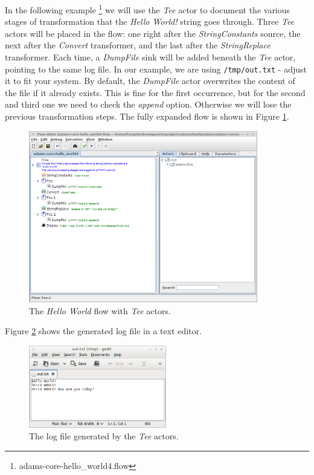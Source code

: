 In the following example \footnote{adams-core-hello\_world4.flow} we will use
the \textit{Tee} actor to document the various stages of transformation that the \textit{Hello World!} string goes
through. Three \textit{Tee} actors will be placed in the flow: one right after
the \textit{StringConstants} source, the next after the \textit{Convert}
transformer, and the last after the \textit{StringReplace} transformer.
Each time, a \textit{DumpFile} sink will be added beneath the \textit{Tee}
actor, pointing to the same log file. In our example, we are using
\texttt{/tmp/out.txt} - adjust it to fit your system. By default, the
\textit{DumpFile} actor overwrites the content of the file if it already exists.
This is fine for the first occurrence, but for the second and third one we need
to check the \textit{append} option. Otherwise we will lose the previous
transformation steps. The fully expanded flow is shown in Figure
\ref{floweditor-helloworld-tee_flow}.
\begin{figure}[htb]
  \centering
  \includegraphics[width=10.0cm]{images/floweditor-helloworld-tee_flow.png}
  \caption{The \textit{Hello World} flow with \textit{Tee} actors.}
  \label{floweditor-helloworld-tee_flow}
\end{figure}
Figure \ref{floweditor-helloworld-tee_logfile} shows the generated log file in a
text editor.
\begin{figure}[htb]
  \centering
  \includegraphics[width=6.0cm]{images/floweditor-helloworld-tee_logfile.png}
  \caption{The log file generated by the \textit{Tee} actors.}
  \label{floweditor-helloworld-tee_logfile}
\end{figure}

